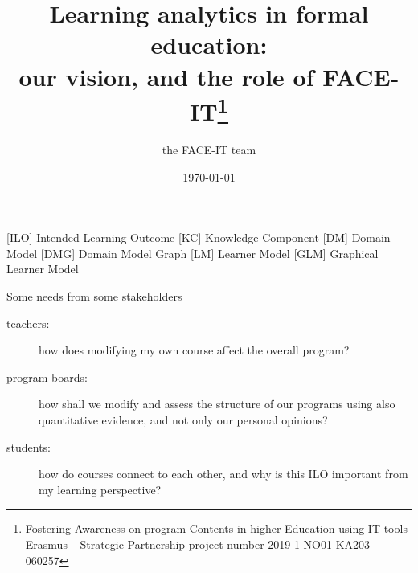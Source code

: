 \newif\ifshownotes													%
\shownotestrue														%
\title		{Learning analytics in formal education: \vspace{0.2cm} \\ our vision, and the role of FACE-IT\footnote{Fostering Awareness on program Contents in higher Education using IT tools \\ Erasmus+ Strategic Partnership project number 2019-1-NO01-KA203-060257}}
\author		{the FACE-IT team}										%
\date		{\today}												%
	[ILO]	{Intended Learning Outcome}
	[KC]	{Knowledge Component}
	[DM]	{Domain Model}
	[DMG]	{Domain Model Graph}
	[LM]	{Learner Model}
	[GLM]	{Graphical Learner Model}


\begin{frame}
	\titlepage
\end{frame}


\begin{frame}{Some needs from some stakeholders}
	\begin{description}
		\item[teachers:] how does modifying my own course affect the overall program?
			\vspace{0.5cm}
		\item[program boards:] how shall we modify and assess the structure of our programs using also quantitative evidence, and not only our personal opinions?
			\vspace{0.5cm}
		\item[students:] how do courses connect to each other, and why is this \ac{ILO} important from my learning perspective?
	\end{description}
\end{frame}


